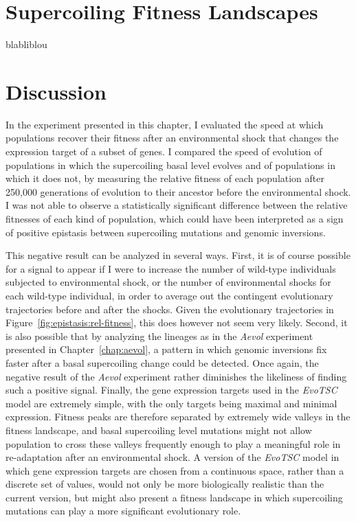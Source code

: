 \section{Supercoiling Fitness Landscapes}

blabliblou


\section{Discussion}

In the experiment presented in this chapter, I evaluated the speed at which populations recover their fitness after an environmental shock that changes the expression target of a subset of genes.
I compared the speed of evolution of populations in which the supercoiling basal level evolves and of populations in which it does not, by measuring the relative fitness of each population after 250,000 generations of evolution to their ancestor before the environmental shock.
I was not able to observe a statistically significant difference between the relative fitnesses of each kind of population, which could have been interpreted as a sign of positive epistasis between supercoiling mutations and genomic inversions.

This negative result can be analyzed in several ways.
First, it is of course possible for a signal to appear if I were to increase the number of wild-type individuals subjected to environmental shock, or the number of environmental shocks for each wild-type individual, in order to average out the contingent evolutionary trajectories before and after the shocks.
Given the evolutionary trajectories in Figure~\ref{fig:epistasis:rel-fitness}, this does however not seem very likely.
Second, it is also possible that by analyzing the lineages as in the \emph{Aevol} experiment presented in Chapter~\ref{chap:aevol}, a pattern in which genomic inversions fix faster after a basal supercoiling change could be detected.
Once again, the negative result of the \emph{Aevol} experiment rather diminishes the likeliness of finding such a positive signal.
Finally, the gene expression targets used in the \emph{EvoTSC} model are extremely simple, with the only targets being maximal and minimal expression.
Fitness peaks are therefore separated by extremely wide valleys in the fitness landscape, and basal supercoiling level mutations might not allow population to cross these valleys frequently enough to play a meaningful role in re-adaptation after an environmental shock.
A version of the \emph{EvoTSC} model in which gene expression targets are chosen from a continuous space, rather than a discrete set of values, would not only be more biologically realistic than the current version, but might also present a fitness landscape in which supercoiling mutations can play a more significant evolutionary role.
